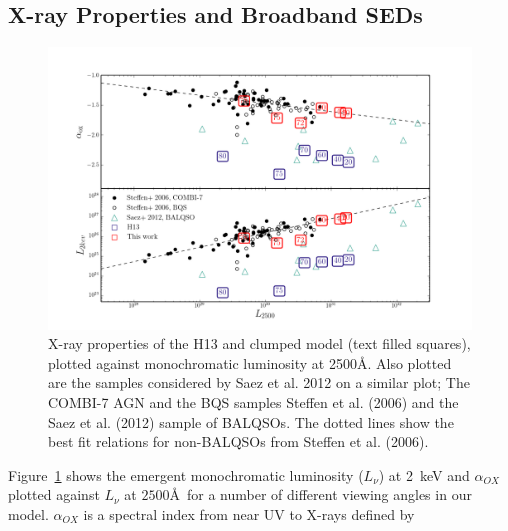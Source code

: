 \documentclass[preprint, a4paper, 11pt]{aastex}
\begin{document}


\subsection{X-ray Properties and Broadband SEDs}

\begin{figure} %
\centering
\includegraphics[width=1.0\textwidth]{figures/alpha_ox_both.png}
\caption
{
X-ray properties of the H13 and clumped model (text filled 
squares), plotted against monochromatic luminosity 
at 2500\AA. Also plotted are the samples considered by
Saez et al. 2012 on a similar plot; The COMBI-7 AGN and
the BQS samples Steffen et al. (2006) and the Saez et al. (2012) sample of BALQSOs.
The dotted lines show the best fit relations for non-BALQSOs from Steffen et al. (2006).
}
\label{fig:xray}
\end{figure} %




Figure~\ref{fig:xray} shows the emergent
monochromatic luminosity ($L_\nu$) at 2~keV and $\alpha_{OX}$ plotted against 
$L_\nu$ at $2500$\AA\ for a number of different viewing angles in our model.
$\alpha_{OX}$ is a spectral index from near UV to X-rays defined by
\end{document}
